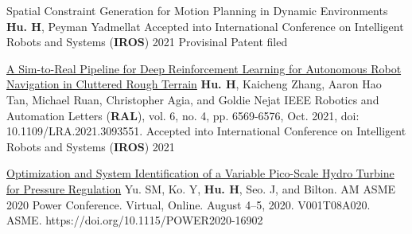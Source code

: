 


\begin{cventries}

  \cvpublicationentryextra
    {Spatial Constraint Generation for Motion Planning in Dynamic Environments} %
    {\textbf{Hu. H}, Peyman Yadmellat} %
    {Accepted into International Conference on Intelligent Robots and Systems (\textbf{IROS}) 2021}
    {Provisinal Patent filed}

  \cvpublicationentryextra
    {\href{https://ieeexplore.ieee.org/document/9468918}{A Sim-to-Real Pipeline for Deep Reinforcement Learning for Autonomous Robot Navigation in Cluttered Rough Terrain}} %
    {\textbf{Hu. H}, Kaicheng Zhang, Aaron Hao Tan, Michael Ruan, Christopher Agia, and Goldie Nejat} %
    {IEEE Robotics and Automation Letters (\textbf{RAL}), vol. 6, no. 4, pp. 6569-6576, Oct. 2021, doi: 10.1109/LRA.2021.3093551.}
    {Accepted into International Conference on Intelligent Robots and Systems (\textbf{IROS}) 2021}

  \cvpublicationentrysimple
    {\href{https://asmedigitalcollection.asme.org/POWER/proceedings-abstract/POWER2020/83747/V001T08A020/1088386}{Optimization and System Identification of a Variable Pico-Scale Hydro Turbine for Pressure Regulation}} %
    {Yu. SM, Ko. Y, \textbf{Hu. H}, Seo. J, and Bilton. AM} %
    {ASME 2020 Power Conference. Virtual, Online. August 4–5, 2020. V001T08A020. ASME. https://doi.org/10.1115/POWER2020-16902}
    
\end{cventries}






